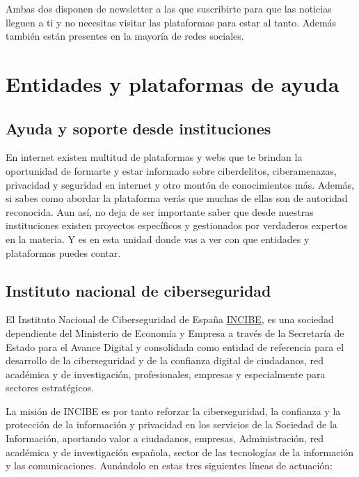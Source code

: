 \documentclass[
  spanish,
  a4paper,
  openany]{book}
\begin{document}
Ambas dos disponen de newsletter a las que suscribirte para que las noticias lleguen a ti y no necesitas visitar las plataformas para estar al tanto. Además también están presentes en la mayoría de redes sociales.

\hypertarget{entidades-y-plataformas-de-ayuda}{%
\chapter{Entidades y plataformas de ayuda}\label{entidades-y-plataformas-de-ayuda}}

\hypertarget{ayuda-y-soporte-desde-instituciones}{%
\section{Ayuda y soporte desde instituciones}\label{ayuda-y-soporte-desde-instituciones}}

En internet existen multitud de plataformas y webs que te brindan la oportunidad de formarte y estar informado sobre ciberdelitos, ciberamenazas, privacidad y seguridad en internet y otro montón de conocimientos más. Además, si sabes como abordar la plataforma verás que muchas de ellas son de autoridad reconocida. Aun así, no deja de ser importante saber que desde nuestras instituciones existen proyectos específicos y gestionados por verdaderos expertos en la materia. Y es en esta unidad donde vas a ver con que entidades y plataformas puedes contar.

\hypertarget{instituto-nacional-de-ciberseguridad}{%
\section{Instituto nacional de ciberseguridad}\label{instituto-nacional-de-ciberseguridad}}

El Instituto Nacional de Ciberseguridad de España \href{https://www.incibe.es/}{INCIBE}, es una sociedad dependiente del Ministerio de Economía y Empresa a través de la Secretaría de Estado para el Avance Digital y consolidada como entidad de referencia para el desarrollo de la ciberseguridad y de la confianza digital de ciudadanos, red académica y de investigación, profesionales, empresas y especialmente para sectores estratégicos.

La misión de INCIBE es por tanto reforzar la ciberseguridad, la confianza y la protección de la información y privacidad en los servicios de la Sociedad de la Información, aportando valor a ciudadanos, empresas, Administración, red académica y de investigación española, sector de las tecnologías de la información y las comunicaciones. Aunándolo en estas tres siguientes líneas de actuación:
\end{document}
